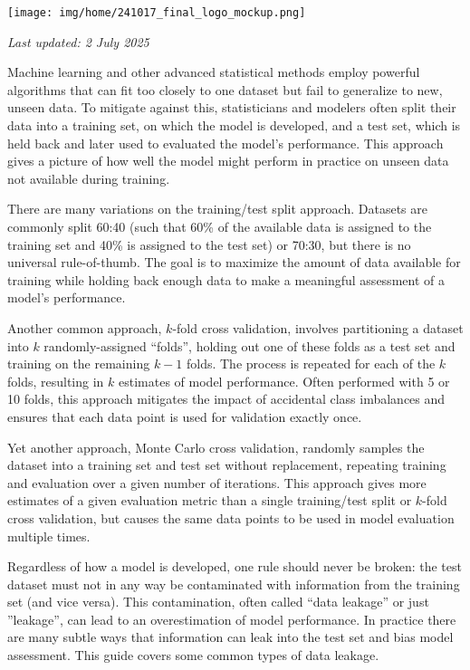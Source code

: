 \documentclass[letterpaper, 12pt]{article}
\begin{document}
\flushleft\texttt{[image: img/home/241017\_final\_logo\_mockup.png]}

\textit{Last updated: 2 July 2025}

Machine learning and other advanced statistical methods employ powerful algorithms that can fit too closely to one dataset but fail to generalize to new, unseen data. To mitigate against this, statisticians and modelers often split their data into a training set, on which the model is developed, and a test set, which is held back and later used to evaluated the model's performance. This approach gives a picture of how well the model might perform in practice on unseen data not available during training.

There are many variations on the training/test split approach. Datasets are commonly split 60:40 (such that 60\% of the available data is assigned to the training set and 40\% is assigned to the test set) or 70:30, but there is no universal rule-of-thumb. The goal is to maximize the amount of data available for training while holding back enough data to make a meaningful assessment of a model's performance. 

Another common approach, $k$-fold cross validation, involves partitioning a dataset into $k$ randomly-assigned ``folds'', holding out one of these folds as a test set and training on the remaining $k-1$ folds. The process is repeated for each of the $k$ folds, resulting in $k$ estimates of model performance. Often performed with 5 or 10 folds, this approach mitigates the impact of accidental class imbalances and ensures that each data point is used for validation exactly once. 

Yet another approach, Monte Carlo cross validation, randomly samples the dataset into a training set and test set without replacement, repeating training and evaluation over a given number of iterations. This approach gives more estimates of a given evaluation metric than a single training/test split or $k$-fold cross validation, but causes the same data points to be used in model evaluation multiple times.

Regardless of how a model is developed, one rule should never be broken: the test dataset must not in any way be contaminated with information from the training set (and vice versa). This contamination, often called ``data leakage'' or just ''leakage'', can lead to an overestimation of model performance. In practice there are many subtle ways that information can leak into the test set and bias model assessment. This guide covers some common types of data leakage.
\end{document}
